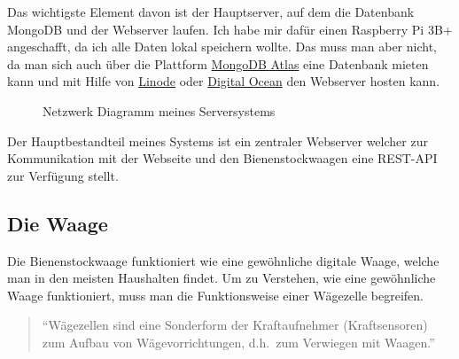 \documentclass[a4paper, ngerman, 11pt]{scrartcl}
\begin{document}
Das wichtigste Element davon ist der Hauptserver, auf dem die Datenbank MongoDB und der Webserver laufen.
Ich habe mir dafür einen Raspberry Pi 3B+ angeschafft, da ich alle Daten lokal speichern wollte.
Das muss man aber nicht, da man sich auch über die Plattform \href{https://www.mongodb.com/cloud/atlas}{MongoDB Atlas} eine Datenbank mieten kann und mit Hilfe von \href{https://www.linode.com}{Linode} oder \href{https://www.digitalocean.com/}{Digital Ocean} den Webserver hosten kann.

\begin{figure}[ht] %
	\centering
	\caption{Netzwerk Diagramm meines Serversystems\label{abb:networkdiagram}}
\end{figure} %

Der Hauptbestandteil meines Systems ist ein zentraler Webserver welcher zur Kommunikation mit der Webseite und den Bienenstockwaagen eine REST-API zur Verfügung stellt.

\subsection{Die Waage}

Die Bienenstockwaage funktioniert wie eine gewöhnliche digitale Waage, welche man in den meisten Haushalten findet.
Um zu Verstehen, wie eine gewöhnliche Waage funktioniert, muss man die Funktionsweise einer Wägezelle begreifen.

\begin{quote}
	\enquote{Wägezellen sind eine Sonderform der Kraftaufnehmer (Kraftsensoren) zum Aufbau von Wägevorrichtungen, d.h.\ zum Verwiegen mit Waagen.}~\autocite[vgl.][]{WikiWaegezelle}
\end{quote}
\end{document}
